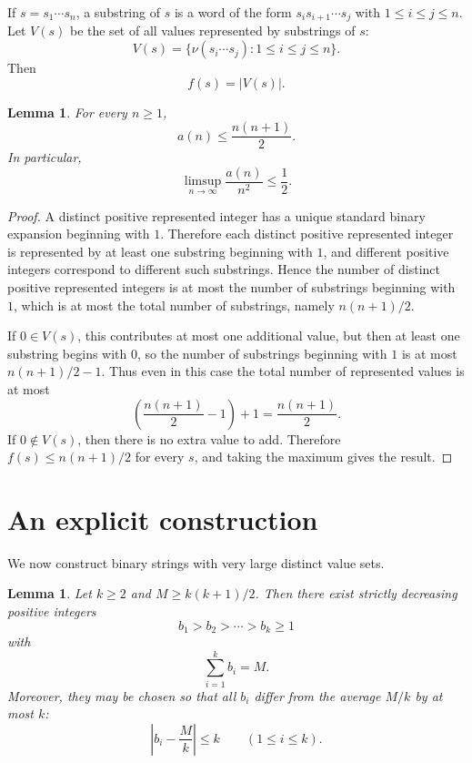 \documentclass[11pt]{article}
\newtheorem{lemma}[theorem]{Lemma}
\newcommand{\val}{\nu}
\begin{document}
If $s=s_1\cdots s_n$, a substring of $s$ is a word of the form $s_i s_{i+1}\cdots s_j$ with $1\le i\le j\le n$.  Let $V(s)$ be the set of all values represented by substrings of $s$:
\[
V(s)=\{\val(s_i\cdots s_j):1\le i\le j\le n\}.
\]
Then
\[
f(s)=|V(s)|.
\]

\begin{lemma}\label{lem:trivial-upper}
For every $n\ge 1$,
\[
a(n)\le \frac{n(n+1)}{2}.
\]
In particular,
\[
\limsup_{n\to\infty}\frac{a(n)}{n^2}\le \frac12.
\]
\end{lemma}

\begin{proof}
A distinct positive represented integer has a unique standard binary expansion beginning with $1$.  Therefore each distinct positive represented integer is represented by at least one substring beginning with $1$, and different positive integers correspond to different such substrings.  Hence the number of distinct positive represented integers is at most the number of substrings beginning with $1$, which is at most the total number of substrings, namely $n(n+1)/2$.

If $0\in V(s)$, this contributes at most one additional value, but then at least one substring begins with $0$, so the number of substrings beginning with $1$ is at most $n(n+1)/2-1$.  Thus even in this case the total number of represented values is at most
\[
\left(\frac{n(n+1)}{2}-1\right)+1=\frac{n(n+1)}{2}.
\]
If $0\notin V(s)$, then there is no extra value to add.  Therefore $f(s)\le n(n+1)/2$ for every $s$, and taking the maximum gives the result.
\end{proof}

\section{An explicit construction}

We now construct binary strings with very large distinct value sets.

\begin{lemma}\label{lem:decreasing-blocks}
Let $k\ge 2$ and $M\ge k(k+1)/2$.  Then there exist strictly decreasing positive integers
\[
b_1>b_2>\cdots>b_k\ge 1
\]
with
\[
\sum_{i=1}^k b_i=M.
\]
Moreover, they may be chosen so that all $b_i$ differ from the average $M/k$ by at most $k$:
\[
\left|b_i-\frac{M}{k}\right|\le k\qquad (1\le i\le k).
\]
\end{lemma}
\end{document}
